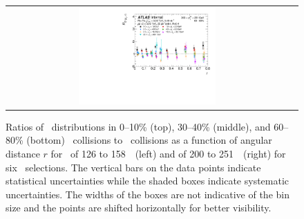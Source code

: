 \begin{figure}[h]
{\begin{tabular}{cc}
            \includegraphics[width=0.5\textwidth]{figures/main/results/RDpT_dR_jet9_cent5.pdf} \\
      \end{tabular}
      }
\caption{Ratios of \Dptr\ distributions in 0--10\% (top), 30--40\% (middle), and 60--80\% (bottom) \PbPb\ collisions to \pp\ collisions as a function of angular distance $r$ for \ptjet\ of 126 to 158~\GeV\ (left) and of 200 to 251~\GeV\ (right) for six \pt\ selections. The vertical bars on the data points indicate statistical uncertainties while the shaded boxes indicate systematic uncertainties. The widths of the boxes are not indicative of the bin size and the points are shifted horizontally for better visibility.}
\label{fig:rdptr}
\end{figure}




\FloatBarrier
